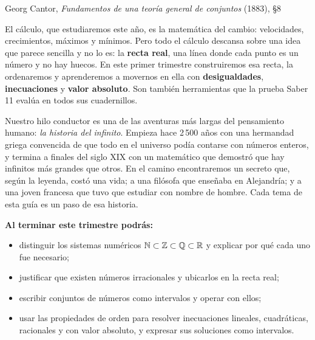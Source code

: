 \documentclass[11pt]{article}
\begin{document}
\encabezado

{Georg Cantor, \emph{Fundamentos de una teoría general de conjuntos} (1883), §8}


El cálculo, que estudiaremos este año, es la matemática del cambio: velocidades,
crecimientos, máximos y mínimos. Pero todo el cálculo descansa sobre una idea que
parece sencilla y no lo es: la \textbf{recta real}, una línea donde cada punto es
un número y no hay huecos. En este primer trimestre construiremos esa recta, la
ordenaremos y aprenderemos a movernos en ella con \textbf{desigualdades},
\textbf{inecuaciones} y \textbf{valor absoluto}. Son también herramientas que la
prueba Saber 11 evalúa en todos sus cuadernillos.

Nuestro hilo conductor es una de las aventuras más largas del pensamiento humano:
\emph{la historia del infinito}. Empieza hace 2\,500 años con una hermandad griega
convencida de que todo en el universo podía contarse con números enteros, y termina
a finales del siglo XIX con un matemático que demostró que hay infinitos más
grandes que otros. En el camino encontraremos un secreto que, según la leyenda,
costó una vida; a una filósofa que enseñaba en Alejandría; y a una joven francesa
que tuvo que estudiar con nombre de hombre. Cada tema de esta guía es un paso de
esa historia.

\textbf{Al terminar este trimestre podrás:}
\begin{itemize}
  \item distinguir los sistemas numéricos $\mathbb{N} \subset \mathbb{Z} \subset \mathbb{Q} \subset \mathbb{R}$ y
        explicar por qué cada uno fue necesario;
  \item justificar que existen números irracionales y ubicarlos en la recta real;
  \item escribir conjuntos de números como intervalos y operar con ellos;
  \item usar las propiedades de orden para resolver inecuaciones lineales,
        cuadráticas, racionales y con valor absoluto, y expresar sus soluciones
        como intervalos.
\end{itemize}
\end{document}

